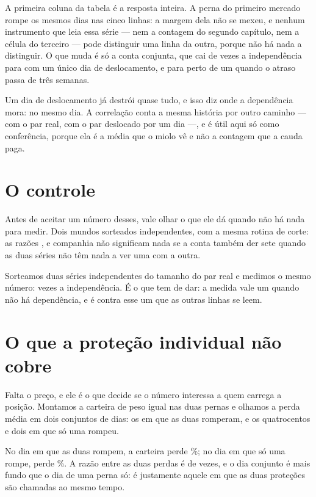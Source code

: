 A primeira coluna da tabela é a resposta inteira. A perna do primeiro mercado rompe os mesmos
\numDependenciaRompeA{} dias nas cinco linhas: a margem dela não se mexeu, e nenhum instrumento
que leia essa série --- nem a contagem do segundo capítulo, nem a célula do terceiro --- pode
distinguir uma linha da outra, porque não há nada a distinguir. O que muda é só a conta
conjunta, que cai de \numDependenciaExcesso{} vezes a independência para
\numDependenciaAtrasoUmDiaExcesso{} com um único dia de deslocamento, e para perto de um quando
o atraso passa de três semanas.

Um dia de deslocamento já destrói quase tudo, e isso diz onde a dependência mora: no mesmo dia.
A correlação conta a mesma história por outro caminho --- \numDependenciaCorrelacao{} com o par
real, \numDependenciaAtrasoUmDiaCorrelacao{} com o par deslocado por um dia ---, e é útil aqui
só como conferência, porque ela é a média que o miolo vê e não a contagem que a cauda paga.

\section{O controle}

Antes de aceitar um número desses, vale olhar o que ele dá quando não há nada para medir. Dois
mundos sorteados independentes, com a mesma rotina de corte: as razões
\numDependenciaExcesso{}, \numDependenciaAtrasoUmDiaExcesso{} e companhia não significam nada se
a conta também der sete quando as duas séries não têm nada a ver uma com a outra.

Sorteamos duas séries independentes do tamanho do par real e medimos o mesmo número: \numDependenciaControleExcesso{} vezes a independência. É o que tem de dar: a medida vale um
quando não há dependência, e é contra esse um que as outras linhas se leem.

\section{O que a proteção individual não cobre}

Falta o preço, e ele é o que decide se o número interessa a quem carrega a posição. Montamos a
carteira de peso igual nas duas pernas e olhamos a perda média em dois conjuntos de dias: os
\numDependenciaJuntos{} em que as duas romperam, e os quatrocentos e dois em que só uma rompeu.

No dia em que as duas rompem, a carteira perde \numDependenciaPerdaJuntosPct\%; no dia em que só
uma rompe, perde \numDependenciaPerdaUmaPernaPct\%. A razão entre as duas perdas é de \numDependenciaPerdaRazao{} vezes, e o dia conjunto é mais fundo que o dia de uma perna só: é justamente aquele em que as duas proteções são chamadas ao mesmo tempo.


